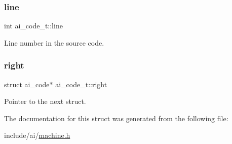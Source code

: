 \subsubsection{\texorpdfstring{line}{line}}
{\footnotesize\ttfamily int ai\+\_\+code\+\_\+t\+::line}

Line number in the source code. \mbox{\label{structai__code__t_a70f38fa9d58b3466eb324f5180971ab9}} 
\subsubsection{\texorpdfstring{right}{right}}
{\footnotesize\ttfamily struct ai\+\_\+code$\ast$ ai\+\_\+code\+\_\+t\+::right}

Pointer to the next struct. 

The documentation for this struct was generated from the following file\+:\begin{DoxyCompactItemize}
\item 
include/ai/\hyperlink{machine_8h}{machine.\+h}\end{DoxyCompactItemize}
